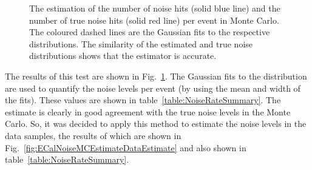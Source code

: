 \begin{figure}%
  \centering
  \caption{The estimation of the number of noise hits (solid blue line) and the number of true noise hits (solid red line) per event in Monte Carlo.  The coloured dashed lines are the Gaussian fits to the respective distributions.  The similarity of the estimated and true noise distributions shows that the estimator is accurate.}
  \label{fig:ECalNoiseMCEstimateMCTrue}
\end{figure}
The results of this test are shown in Fig.~\ref{fig:ECalNoiseMCEstimateMCTrue}.  The Gaussian fits to the distribution are used to quantify the noise levels per event (by using the mean and width of the fits).  These values are shown in table~\ref{table:NoiseRateSummary}.  The estimate is clearly in good agreement with the true noise levels in the Monte Carlo.  So, it was decided to apply this method to estimate the noise levels in the data samples, the results of which are shown in Fig.~\ref{fig:ECalNoiseMCEstimateDataEstimate} and also shown in table~\ref{table:NoiseRateSummary}.
